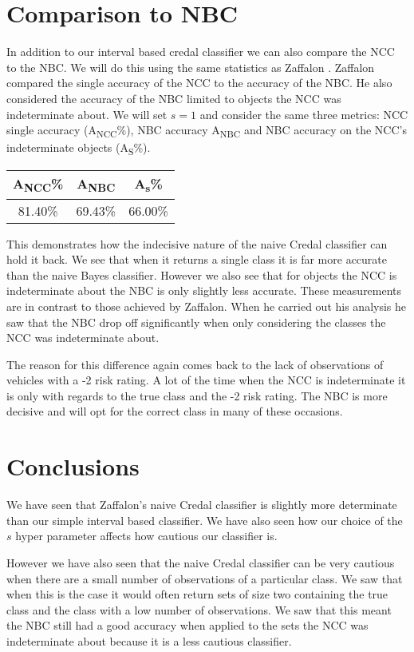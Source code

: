 \section{Comparison to NBC}

In addition to our interval based credal classifier we can also compare the NCC to the NBC.
We will do this using the same statistics as Zaffalon \cite{Zaffalon01}.
Zaffalon compared the single accuracy of the NCC to the accuracy of the NBC.
He also considered the accuracy of the NBC limited to objects the NCC was indeterminate about.
We will set $s=1$ and consider the same three metrics: NCC single accuracy (A\textsubscript{NCC}\%), NBC accuracy A\textsubscript{NBC} and NBC accuracy on  the NCC's indeterminate objects (A\textsubscript{S}\%).
\begin{center}
\begin{tabular}{c c c}
\hline
A\textsubscript{NCC}\% & A\textsubscript{NBC} & A\textsubscript{s}\% \\
\hline
81.40\%                & 69.43\%              & 66.00\% \\
\hline
\end{tabular}
\end{center}

This demonstrates how the indecisive nature of the naive Credal classifier can hold it back.
We see that when it returns a single class it is far more accurate than the naive Bayes classifier.
However we also see that for objects the NCC is indeterminate about the NBC is only slightly less accurate.
These measurements are in contrast to those achieved by Zaffalon.
When he carried out his analysis he saw that the NBC drop off significantly when only considering the classes the NCC was indeterminate about.

The reason for this difference again comes back to the lack of observations of vehicles with a -2 risk rating.
A lot of the time when the NCC is indeterminate it is only with regards to the true class and the -2 risk rating.
The NBC is more decisive and will opt for the correct class in many of these occasions.

\section{Conclusions}

We have seen that Zaffalon's naive Credal classifier is slightly more determinate than our simple interval based classifier.
We have also seen how our choice of the $s$ hyper parameter affects how cautious our classifier is.

However we have also seen that the naive Credal classifier can be very cautious when there are a small number of observations of a particular class.
We saw that when this is the case it would often return sets of size two containing the true class and the class with a low number of observations.
We saw that this meant the NBC still had a good accuracy when applied to the sets the NCC was indeterminate about because it is a less cautious classifier.